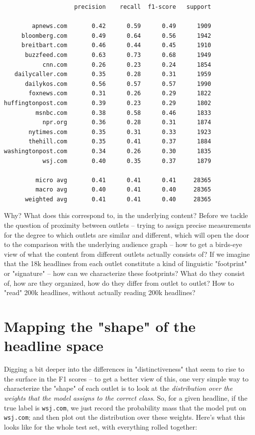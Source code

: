 \documentclass{scrartcl}
\begin{document}
\begin{lstlisting}
                    precision    recall  f1-score   support

        apnews.com       0.42      0.59      0.49      1909
     bloomberg.com       0.49      0.64      0.56      1942
     breitbart.com       0.46      0.44      0.45      1910
      buzzfeed.com       0.63      0.73      0.68      1949
           cnn.com       0.26      0.23      0.24      1854
   dailycaller.com       0.35      0.28      0.31      1959
      dailykos.com       0.56      0.57      0.57      1990
       foxnews.com       0.31      0.26      0.29      1822
huffingtonpost.com       0.39      0.23      0.29      1802
         msnbc.com       0.38      0.58      0.46      1833
           npr.org       0.36      0.28      0.31      1874
       nytimes.com       0.35      0.31      0.33      1923
       thehill.com       0.35      0.41      0.37      1884
washingtonpost.com       0.34      0.26      0.30      1835
           wsj.com       0.40      0.35      0.37      1879

         micro avg       0.41      0.41      0.41     28365
         macro avg       0.40      0.41      0.40     28365
      weighted avg       0.41      0.41      0.40     28365
\end{lstlisting}

Why? What does this correspond to, in the underlying content? Before we tackle the question of proximity between outlets -- trying to assign precise measurements for the degree to which outlets are similar and different, which will open the door to the comparison with the underlying audience graph -- how to get a birds-eye view of what the content from different outlets actually consists of? If we imagine that the 18k headlines from each outlet constitute a kind of linguistic "footprint" or "signature" -- how can we characterize these footprints? What do they consist of, how are they organized, how do they differ from outlet to outlet? How to "read" 200k headlines, without actually reading 200k headlines?

\section{Mapping the "shape" of the headline space}

Digging a bit deeper into the differences in "distinctiveness" that seem to rise to the surface in the F1 scores -- to get a better view of this, one very simple way to characterize the "shape" of each outlet is to look at the \textit{distribution over the weights that the model assigns to the correct class}. So, for a given headline, if the true label is \texttt{wsj.com}, we just record the probability mass that the model put on \texttt{wsj.com}; and then plot out the distribution over these weights. Here's what this looks like for the whole test set, with everything rolled together:
\end{document}
